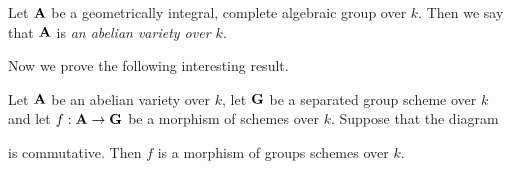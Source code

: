 \begin{definition}
Let $\mathbf{A}$ be a geometrically integral, complete algebraic group over $k$. Then we say that $\mathbf{A}$ is \textit{an abelian variety over $k$}.
\end{definition}
\noindent
Now we prove the following interesting result.

\begin{theorem}\label{theorem:morphisms_from_abelian_varieties}
Let $\mathbf{A}$ be an abelian variety over $k$, let $\mathbf{G}$ be a separated group scheme over $k$ and let $f:\mathbf{A}\rightarrow \mathbf{G}$ be a morphism of schemes over $k$. Suppose that the diagram
\begin{center}
\end{center}
is commutative. Then $f$ is a morphism of groups schemes over $k$.
\end{theorem}

